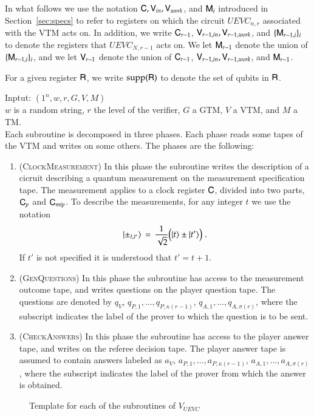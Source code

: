 In what follows we use the notation ${\mathsf{C}},{\mathsf{V}}_{in},{\mathsf{V}}_{work}$, and ${\mathsf{M}}_i$ introduced in Section~\ref{sec:specs} to refer to registers on which the circuit $UEVC_{n,r}$ associated with the VTM acts on. In addition, we write ${\mathsf{C}}_{r-1}$, ${\mathsf{V}}_{r-1,in},{\mathsf{V}}_{r-1,work}$, and $\{ {\mathsf{M}}_{r-1,i} \}_i$ to denote the registers that $UEVC_{N,r-1}$ acts on. We let ${\mathsf{M}}_{r-1}$ denote the union of $\{ {\mathsf{M}}_{r-1,i} \}_i$, and we let ${\mathsf{V}}_{r-1}$ denote the union of ${\mathsf{C}}_{r-1}$, ${\mathsf{V}}_{r-1,in},{\mathsf{V}}_{r-1,work}$, and ${\mathsf{M}}_{r-1}$. 

For a given register ${\mathsf{R}}$, we write $\operatorname{supp}({\mathsf{R}})$ to denote the set of qubits in ${\mathsf{R}}$.






\vspace{10pt}
\begin{center}
\begin{mdframed}
Inptut: $(1^n,w,r,G,V,M)$\\
  $w$ is a random string, $r$ the level of the verifier, $G$ a GTM, $V$ a VTM, and $M$ a TM.\\
Each subroutine is decomposed in three phases. Each phase reads some tapes of the VTM and writes on some others. The phases are the following: 
	\begin{enumerate}
		\item (\textsc{ClockMeasurement}) In this phase the subroutine writes the description of a cicruit describing a quantum measurement on the measurement specification tape. The measurement applies to a clock register ${\mathsf{C}}$, divided into two parts, ${\mathsf{C}}_{p}$ and ${\mathsf{C}}_{mip}$. To describe the measurements, for any integer $t$ we use the notation 
$$|\pm_{t,t'}\rangle \,=\, \frac{1}{\sqrt{2}}\big(|t\rangle\pm|t'\rangle\big)\;.$$
If $t'$ is not specified it is understood that $t'=t+1$.
	\item (\textsc{GenQuestions}) In this phase the subroutine has access to the measurement outcome tape, and writes questions on the player question tape. The questions are denoted  by $q_V$, $q_{P,1},\ldots,q_{P,\kappa(r-1)}$, $q_{A,1},\ldots,q_{A,\sigma(r)}$, where the subscript indicates the label of the prover to which the question is to be sent. 
		\item (\textsc{CheckAnswers}) In this phase the subroutine has access to the player answer tape, and writes on the referee decision tape. The player answer tape is assumed to contain answers labeled as $a_V$, $a_{P,1},\ldots,a_{P,\kappa(r-1)}$, $a_{A,1},\ldots,a_{A,\sigma(r)}$, where the subscript indicates the label of the prover from which the answer is obtained.
	\end{enumerate}    
\end{mdframed}

\end{center}
\begin{figure}[H]
\caption{Template for each of the subroutines of $V_{UEVC}$}
\label{fig:check_structure}
\end{figure}





